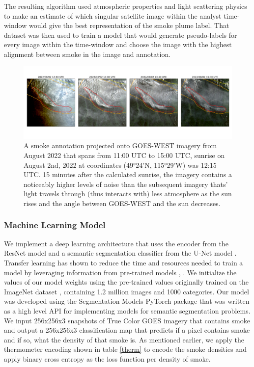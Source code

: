 \documentclass{ametsocV6.1}
\begin{document}
The resulting algorithm used atmospheric properties and light scattering physics to make an estimate of which singular satellite image within the analyst time-window would give the best representation of the smoke plume label. That dataset was then used to train a model that would generate pseudo-labels for every image within the time-window and choose the image with the highest alignment between smoke in the image and annotation.


\begin{figure}
    \centering
    \includegraphics[width=16cm]{figures/timelapse_G17_2.png}
    \caption{A smoke annotation projected onto GOES-WEST imagery from August 2022 that spans from 11:00 UTC to 15:00 UTC, sunrise on August 2nd, 2022 at coordinates (49°24'N, 115°29'W) was 12:15 UTC. 15 minutes after the calculated sunrise, the imagery contains a noticeably higher levels of noise than the subsequent imagery thats' light travels through (thus interacts with) less atmosphere as the sun rises and the angle between GOES-WEST and the sun decreases. }\label{G17_sunrise}
\end{figure}




\subsubsection*{Machine Learning Model} 

We implement a deep learning architecture that uses the encoder from the ResNet model \citep{resnet} and a semantic segmentation classifier from the U-Net model \citep{unet}. Transfer learning has shown to reduce the time and resources needed to train a model by leveraging information from pre-trained models \citep{transfer}, \citep{transfer2}.  We initialize the values of our model weights using the pre-trained values originally trained on the ImageNet dataset \citep{imgnet}, containing 1.2 million images and 1000 categories. Our model was developed using the Segmentation Models PyTorch package \citep{semantic} that was written as a high level API for implementing models for semantic segmentation problems.  We input 256x256x3 snapshots of True Color GOES imagery that contains smoke and output a 256x256x3 classification map that predicts if a pixel contains smoke and if so, what the density of that smoke is. As mentioned earlier, we apply the thermometer encoding shown in table \ref{therm} to encode the smoke densities and apply binary cross entropy as the loss function per density of smoke. 
\end{document}
